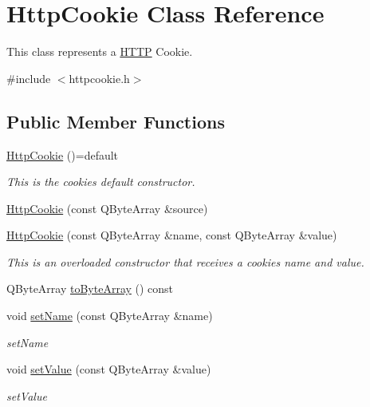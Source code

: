 \hypertarget{class_http_cookie}{}\section{Http\+Cookie Class Reference}
\label{class_http_cookie}


This class represents a \hyperlink{namespace_h_t_t_p}{H\+T\+TP} Cookie.  




{\ttfamily \#include $<$httpcookie.\+h$>$}

\subsection*{Public Member Functions}
\begin{DoxyCompactItemize}
\item 
\hyperlink{class_http_cookie_a728bef99b74d352b1762cc98e67cc93c}{Http\+Cookie} ()=default
\begin{DoxyCompactList}\small\item\em This is the cookie\textquotesingle{}s default constructor. \end{DoxyCompactList}\item 
\hyperlink{class_http_cookie_aeb0f2cb5f7e8ef2fc7503663e29941c4}{Http\+Cookie} (const Q\+Byte\+Array \&source)
\item 
\hyperlink{class_http_cookie_a2037d1e3f9a6f65f0f3575df1cfcc200}{Http\+Cookie} (const Q\+Byte\+Array \&name, const Q\+Byte\+Array \&value)
\begin{DoxyCompactList}\small\item\em This is an overloaded constructor that receives a cookie\textquotesingle{}s name and value. \end{DoxyCompactList}\item 
Q\+Byte\+Array \hyperlink{class_http_cookie_aef937847dbebf7290e94b94afbb8f9a1}{to\+Byte\+Array} () const
\item 
void \hyperlink{class_http_cookie_a18dc03fc2cc3901051f7aec516c964b8}{set\+Name} (const Q\+Byte\+Array \&name)
\begin{DoxyCompactList}\small\item\em set\+Name \end{DoxyCompactList}\item 
void \hyperlink{class_http_cookie_a2f38c00473e7628a708eae2dd0cd51f0}{set\+Value} (const Q\+Byte\+Array \&value)
\begin{DoxyCompactList}\small\item\em set\+Value \end{DoxyCompactList}\item 

\end{DoxyCompactItemize}
